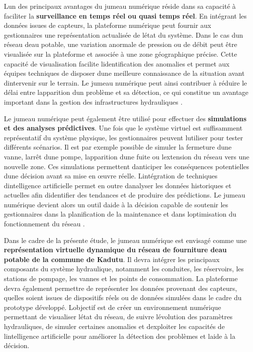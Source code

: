 \documentclass[12pt,a4paper,oneside]{report}
\begin{document}
L\textquotesingle un des principaux avantages du jumeau numérique réside
dans sa capacité à faciliter la \textbf{surveillance en temps réel ou
quasi temps réel}. En intégrant les données issues de capteurs, la
plateforme numérique peut fournir aux gestionnaires une représentation
actualisée de l\textquotesingle état du système. Dans le cas
d\textquotesingle un réseau d\textquotesingle eau potable, une variation
anormale de pression ou de débit peut être visualisée sur la plateforme
et associée à une zone géographique précise. Cette capacité de
visualisation facilite l\textquotesingle identification des anomalies et
permet aux équipes techniques de disposer d\textquotesingle une
meilleure connaissance de la situation avant
d\textquotesingle intervenir sur le terrain. Le jumeau numérique peut
ainsi contribuer à réduire le délai entre l\textquotesingle apparition
d\textquotesingle un problème et sa détection, ce qui constitue un
avantage important dans la gestion des infrastructures hydrauliques
\cite{ref17}.

Le jumeau numérique peut également être utilisé pour effectuer des
\textbf{simulations et des analyses prédictives}. Une fois que le
système virtuel est suffisamment représentatif du système physique, les
gestionnaires peuvent l\textquotesingle utiliser pour tester différents
scénarios. Il est par exemple possible de simuler la fermeture
d\textquotesingle une vanne, l\textquotesingle arrêt
d\textquotesingle une pompe, l\textquotesingle apparition
d\textquotesingle une fuite ou l\textquotesingle extension du réseau
vers une nouvelle zone. Ces simulations permettent
d\textquotesingle anticiper les conséquences potentielles
d\textquotesingle une décision avant sa mise en œuvre réelle.
L\textquotesingle intégration de techniques
d\textquotesingle intelligence artificielle permet en outre
d\textquotesingle analyser les données historiques et actuelles afin
d\textquotesingle identifier des tendances et de produire des
prédictions. Le jumeau numérique devient alors un outil
d\textquotesingle aide à la décision capable de soutenir les
gestionnaires dans la planification de la maintenance et dans
l\textquotesingle optimisation du fonctionnement du réseau \cite{ref61}.

Dans le cadre de la présente étude, le jumeau numérique est envisagé
comme une \textbf{représentation virtuelle dynamique du réseau de
fourniture d\textquotesingle eau potable de la commune de Kadutu}. Il
devra intégrer les principaux composants du système hydraulique,
notamment les conduites, les réservoirs, les stations de pompage, les
vannes et les points de consommation. La plateforme devra également
permettre de représenter les données provenant des capteurs,
qu\textquotesingle elles soient issues de dispositifs réels ou de
données simulées dans le cadre du prototype développé.
L\textquotesingle objectif est de créer un environnement numérique
permettant de visualiser l\textquotesingle état du réseau, de suivre
l\textquotesingle évolution des paramètres hydrauliques, de simuler
certaines anomalies et d\textquotesingle exploiter les capacités de
l\textquotesingle intelligence artificielle pour améliorer la détection
des problèmes et l\textquotesingle aide à la décision.
\end{document}
